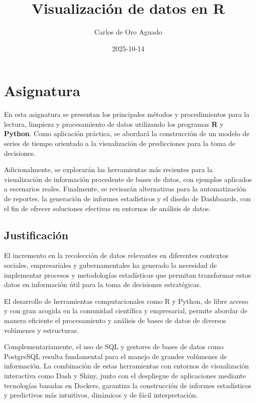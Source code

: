 \documentclass[
]{book}
\title{Visualización de datos en R}
\author{Carlos de Oro Aguado}
\date{2025-10-14}
\begin{document}
\maketitle

{
\setcounter{tocdepth}{1}
\tableofcontents
}
\chapter*{Asignatura}\label{asignatura}

En esta asignatura se presentan los principales métodos y procedimientos para la lectura, limpieza y procesamiento de datos utilizando los programas \textbf{R} y \textbf{Python}. Como aplicación práctica, se abordará la construcción de un modelo de series de tiempo orientado a la visualización de predicciones para la toma de decisiones.

Adicionalmente, se explorarán las herramientas más recientes para la visualización de información procedente de bases de datos, con ejemplos aplicados a escenarios reales. Finalmente, se revisarán alternativas para la automatización de reportes, la generación de informes estadísticos y el diseño de Dashboards, con el fin de ofrecer soluciones efectivas en entornos de análisis de datos.

\section*{Justificación}\label{justificaciuxf3n}

El incremento en la recolección de datos relevantes en diferentes contextos sociales, empresariales y gubernamentales ha generado la necesidad de implementar procesos y metodologías estadísticas que permitan transformar estos datos en información útil para la toma de decisiones estratégicas.

El desarrollo de herramientas computacionales como R y Python, de libre acceso y con gran acogida en la comunidad científica y empresarial, permite abordar de manera eficiente el procesamiento y análisis de bases de datos de diversos volúmenes y estructuras.

Complementariamente, el uso de SQL y gestores de bases de datos como PostgreSQL resulta fundamental para el manejo de grandes volúmenes de información. La combinación de estas herramientas con entornos de visualización interactiva como Dash y Shiny, junto con el despliegue de aplicaciones mediante tecnologías basadas en Dockers, garantiza la construcción de informes estadísticos y predictivos más intuitivos, dinámicos y de fácil interpretación.
\end{document}
